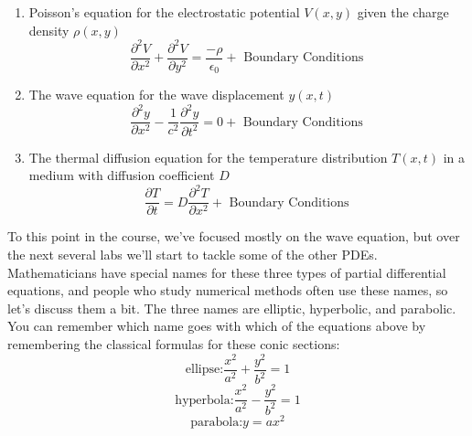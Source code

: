 \documentclass{book}
\theoremstyle{plain}
\theoremstyle{definition}
\numberwithin{exm}{chapter}
\theoremstyle{remark}
\theoremstyle{summary}
\theoremstyle{overview}
\begin{document}
\begin{enumerate}[label=(\roman*)]
\item Poisson\rq s equation for the electrostatic potential $V (x, y)$ given the charge
density $ρ(x, y)$
\begin{equation}\label{eq:69}
\frac{\partial^{2} V}{\partial x^{2}}+\frac{\partial^{2} V}{\partial y^{2}}=\frac{-\rho}{\epsilon_{0}}+\text { Boundary Conditions }
\end{equation}
\item The wave equation for the wave displacement $y(x,t)$
\begin{equation}\label{eq:610}
\frac{\partial^{2} y}{\partial x^{2}}-\frac{1}{c^{2}} \frac{\partial^{2} y}{\partial t^{2}}=0+\text { Boundary Conditions }
\end{equation}
\item The thermal diffusion equation for the temperature distribution $T(x,t)$ in a
medium with diffusion coefficient $D$
\begin{equation}\label{eq:611}
\frac{\partial T}{\partial t}=D \frac{\partial^{2} T}{\partial x^{2}}+\text { Boundary Conditions }
\end{equation}
\end{enumerate}
To this point in the course, we\rq ve focused mostly on the wave equation, but over
the next several labs we\rq ll start to tackle some of the other PDEs. \\
Mathematicians have special names for these three types of partial differential
equations, and people who study numerical methods often use these names, so
let\rq s discuss them a bit. The three names are elliptic, hyperbolic, and parabolic.
You can remember which name goes with which of the equations above by remembering the classical formulas for these conic sections:
\begin{equation}\label{eq:612}
\text{ellipse:} \frac{x^{2}}{a^{2}}+\frac{y^{2}}{b^{2}}=1
\end{equation}
\begin{equation}\label{eq:613}
\text{hyperbola:} \frac{x^{2}}{a^{2}}-\frac{y^{2}}{b^{2}}=1
\end{equation}
\begin{equation}\label{eq:614}
\text{parabola:} y=a x^{2}
\end{equation}
\end{document}
